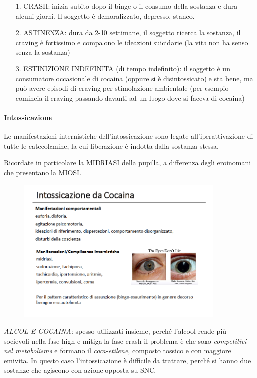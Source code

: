 \begin{itemize}
\item[1.]
  CRASH: inizia subito dopo il binge o il consumo della sostanza e dura
  alcuni giorni. Il soggetto è demoralizzato, depresso, stanco.
\item[2.]
  ASTINENZA: dura da 2-10 settimane, il soggetto ricerca la sostanza, il
  craving è fortissimo e compaiono le ideazioni suicidarie (la vita non
  ha senso senza la sostanza)
\item[3.]
  ESTINIZIONE INDEFINITA (di tempo indefinito): il soggetto è un
  consumatore occasionale di cocaina (oppure si è disintossicato) e sta
  bene, ma può avere episodi di craving per stimolazione ambientale (per
  esempio comincia il craving passando davanti ad un luogo dove si
  faceva di cocaina)
\end{itemize}

\paragraph{Intossicazione}

Le manifestazioni internistiche dell'intossicazione sono legate
all'iperattivazione di tutte le catecolemine, la cui liberazione è
indotta dalla sostanza stessa.

Ricordate in particolare la MIDRIASI della pupilla, a differenza degli
eroinomani che presentano la MIOSI.

\begin{figure}[!ht]
\centering
	\includegraphics[width=0.9\textwidth]{017/image18.png}
\end{figure}

\emph{ALCOL E COCAINA:} spesso utilizzati insieme, perché l'alcool rende
più socievoli nella fase high e mitiga la fase crash il problema è che
sono \emph{competitivi nel metabolismo} e formano il
\emph{coca-etilene}, composto tossico e con maggiore emivita. In questo
caso l'intossicazione è difficile da trattare, perché si hanno due
sostanze che agiscono con azione opposta su SNC.

